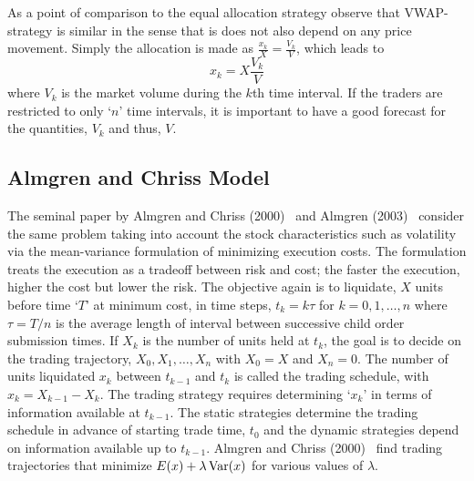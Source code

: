 As a point of comparison to the equal allocation strategy observe that VWAP-strategy is similar in the sense that is does not also depend on any price movement. Simply the allocation is made as $\frac{x_k}{X}=\frac{V_k}{V}$, which leads to
	\begin{equation}\label{eqn:xk}
	x_k = X \dfrac{V_k}{V}
	\end{equation}
where $V_k$ is the market volume during the $k$th time interval. If the traders are restricted to only `$n$' time intervals, it is important to have a good forecast for the quantities, $V_k$ and thus, $V$. 


\subsection{Almgren and Chriss Model}


The seminal paper by Almgren and Chriss (2000)~\cite{alm2000} and Almgren (2003)~\cite{} consider the same problem taking into account the stock characteristics such as volatility via the mean-variance formulation of minimizing execution costs. The formulation treats the execution as a tradeoff between risk and cost; the faster the execution, higher the cost but lower the risk. The objective again is to liquidate, $X$ units before time `$T$' at minimum cost, in time steps, $t_k = k\tau$ for $k = 0,1,\ldots, n$ where $\tau = T/n$ is the average length of interval between successive child order submission times. If $X_k$ is the number of units held at $t_k$, the goal is to decide on the trading trajectory, $X_0,X_1,\ldots,X_n$ with $X_0=X$ and $X_n=0$. The number of units liquidated $x_k$ between $t_{k-1}$ and $t_k$ is called the trading schedule, with $x_k = X_{k-1} - X_k$. The trading strategy requires determining `$x_k$' in terms of information available at $t_{k-1}$. The static strategies determine the trading schedule in advance of starting trade time, $t_0$ and the dynamic strategies depend on information available up to $t_{k-1}$. Almgren and Chriss (2000)~\cite{alm2000} find trading trajectories that minimize $E(x)+\lambda \operatorname{Var}(x)$ for various values of $\lambda$.


